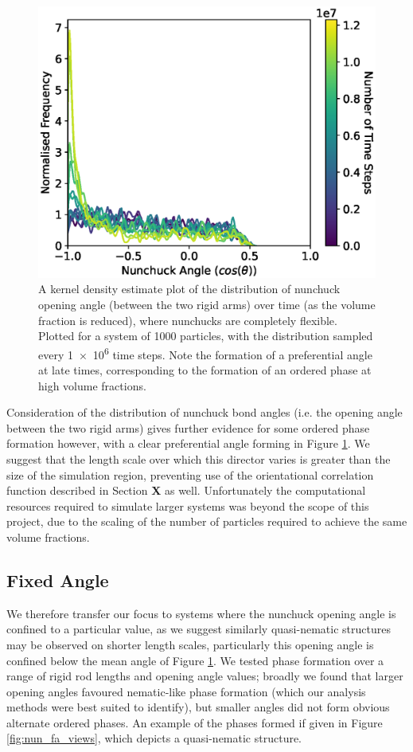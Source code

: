 \documentclass[11pt, a4paper]{article} %
\begin{document}
\begin{figure} [h!]
	\centering
	\includegraphics[width=0.7\linewidth]{Figures/nun_fr_angledist}
	\caption{A kernel density estimate plot of the distribution of nunchuck opening angle (between the two rigid arms) over time (as the volume fraction is reduced), where nunchucks are completely flexible. Plotted for a system of \num{1000} particles, with the distribution sampled every \num{1e6} time steps. Note the formation of a preferential angle at late times, corresponding to the formation of an ordered phase at high volume fractions.}
	\label{fig:nun_fr_angledist}
\end{figure}  %

Consideration of the distribution of nunchuck bond angles (i.e. the opening angle between the two rigid arms) gives further evidence for some ordered phase formation however, with a clear preferential angle forming in Figure \ref{fig:nun_fr_angledist}. We suggest that the length scale over which this director varies is greater than the size of the simulation region, preventing use of the orientational correlation function described in Section \textbf{X} as well. Unfortunately the computational resources required to simulate larger systems was beyond the scope of this project, due to the scaling of the number of particles required to achieve the same volume fractions. 



\subsection{Fixed Angle}
We therefore transfer our focus to systems where the nunchuck opening angle is confined to a particular value, as we suggest similarly quasi-nematic structures may be observed on shorter length scales,  particularly this opening angle is confined below the mean angle of Figure \ref{fig:nun_fr_angledist}.
We tested phase formation over a range of rigid rod lengths and opening angle values; broadly we found that larger opening angles favoured nematic-like phase formation (which our analysis methods were best suited to identify), but smaller angles did not form obvious alternate ordered phases. An example of the phases formed if given in Figure \ref{fig:nun_fa_views}, which depicts a quasi-nematic structure.
\end{document}
